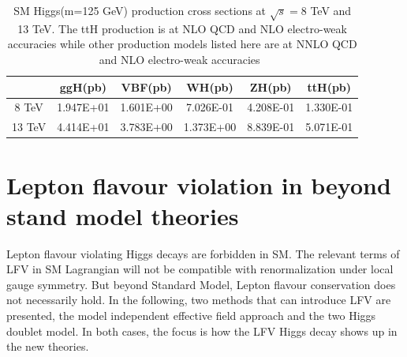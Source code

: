 \begin{table}[htp!]
\caption{SM Higgs(m=125 GeV) production cross sections at $\sqrt{s}=8$ TeV and 13 TeV. The ttH production is at NLO QCD and NLO electro-weak accuracies while other production models listed here are at NNLO QCD and NLO electro-weak accuracies~\cite{Yellow_report}}
\begin{center}
\begin{tabular}{|c|c|c|c|c|c|}\hline
           & ggH(pb)             &  VBF(pb)      &   WH(pb)      &   ZH(pb)          & ttH(pb)\\\hline
8 TeV  &  1.947E+01       & 1.601E+00    &  7.026E-01  &   4.208E-01    & 1.330E-01      \\\hline
13 TeV &   4.414E+01      &  3.783E+00   &  1.373E+00 &   8.839E-01    &  5.071E-01     \\\hline
\end{tabular}
\end{center}
\label{cross_section_numbers}
\end{table}









\section{Lepton flavour violation in beyond stand model theories}
Lepton flavour violating Higgs decays are forbidden in SM. The relevant terms of LFV in SM Lagrangian will not be compatible with renormalization under local gauge symmetry. But beyond Standard Model, Lepton flavour conservation does not necessarily hold. In the following, two methods that can introduce LFV are presented, the model independent effective field approach and the two Higgs doublet model. In both cases, the focus is how the LFV Higgs decay shows up in the new theories. 


